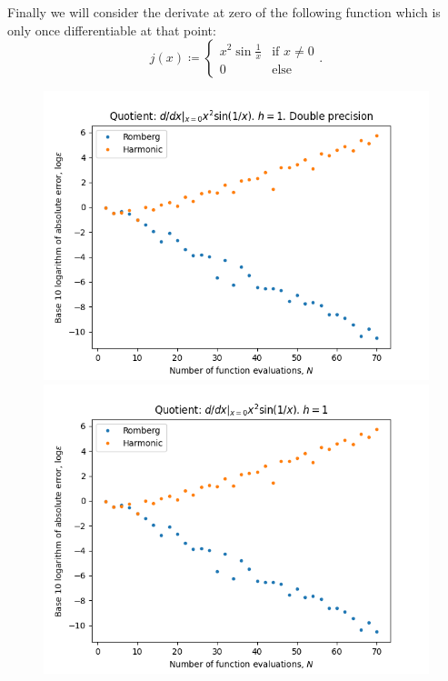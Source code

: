 Finally we will consider the derivate at zero of the following function which is only once differentiable at that point:
\[
j(x)\coloneqq \begin{cases}
x^2\sin\frac{1}{x} & \text{if } x \neq 0\\
0 & \text{else}
\end{cases}.
\]

\begin{figure}[H]
\centering
\begin{minipage}{0.45\textwidth}
\centering
\includegraphics[scale=0.45]{../results/diff_quot_plots/xsin.png}
\end{minipage}
\begin{minipage}{0.45\textwidth}
\centering
\includegraphics[scale=0.45]{../results/diff_quot_plots/xsin_hp.png}
\end{minipage}
\end{figure}

